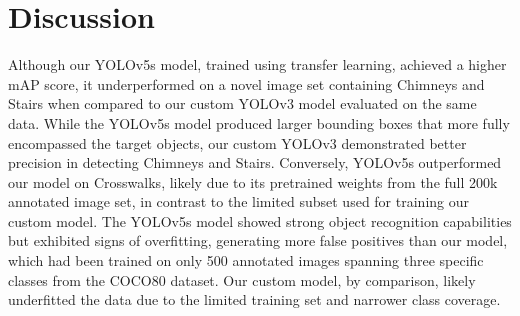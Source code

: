 \documentclass{article}
\begin{document}
\section{Discussion}
\label{discussion}
Although our YOLOv5s model, trained using transfer learning, achieved a higher mAP score, it underperformed on a novel image set containing Chimneys and Stairs when compared to our custom YOLOv3 model evaluated on the same data. While the YOLOv5s model produced larger bounding boxes that more fully encompassed the target objects, our custom YOLOv3 demonstrated better precision in detecting Chimneys and Stairs. Conversely, YOLOv5s outperformed our model on Crosswalks, likely due to its pretrained weights from the full 200k annotated image set, in contrast to the limited subset used for training our custom model. The YOLOv5s model showed strong object recognition capabilities but exhibited signs of overfitting, generating more false positives than our model, which had been trained on only 500 annotated images spanning three specific classes from the COCO80 dataset. Our custom model, by comparison, likely underfitted the data due to the limited training set and narrower class coverage.
\end{document}
